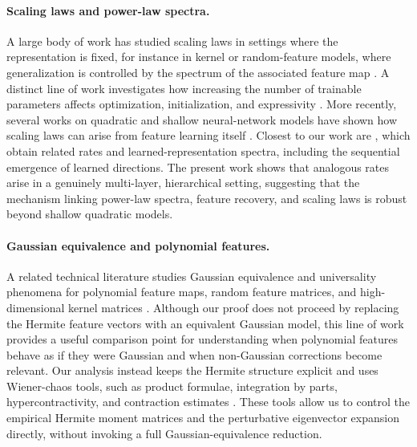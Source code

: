 \documentclass[]{article}
\numberwithin{equation}{section}
\theoremstyle{definition}
\begin{document}
\paragraph{Scaling laws and power-law spectra.}
A large body of work has studied scaling laws in settings where the representation is fixed, for instance in kernel or random-feature models, where generalization is controlled by the spectrum of the associated feature map \citep{caponnetto2007optimal,bordelon2020spectrum,spigler2020asymptotic,cui2021generalization,maloney2022solvable,cui2023error,bahri2024explaining,paquette2024four,defilippis2024dimension,atanasov2024scaling,bordelon2024dynamical,wortsman2025kernel}. A distinct line of work investigates how increasing the number of trainable parameters affects optimization, initialization, and expressivity \citep{yang2021tuning,bordelon2023depthwise,chizat2024feature,chaintron2026resnets}. More recently, several works on quadratic and shallow neural-network models have shown how scaling laws can arise from feature learning itself \citep{ren2025emergence,benarous2025learning,defilippis2025optimal,defilippis2025scaling,boncoraglio2025single}. Closest to our work are \citep{defilippis2025optimal,defilippis2025scaling}, which obtain related rates and learned-representation spectra, including the sequential emergence of learned directions. The present work shows that analogous rates arise in a genuinely multi-layer, hierarchical setting, suggesting that the mechanism linking power-law spectra, feature recovery, and scaling laws is robust beyond shallow quadratic models.

\paragraph{Gaussian equivalence and polynomial features.} A related technical literature studies Gaussian equivalence and universality phenomena for polynomial feature maps, random feature matrices, and high-dimensional kernel matrices \citep{hu2024asymptotics,COLTXU2025,wen2025does,lu2025equivalence}. Although our proof does not proceed by replacing the Hermite feature vectors with an equivalent Gaussian model, this line of work provides a useful comparison point for understanding when polynomial features behave as if they were Gaussian and when non-Gaussian corrections become relevant. Our analysis instead keeps the Hermite structure explicit and uses Wiener-chaos tools, such as product formulae, integration by parts, hypercontractivity, and contraction estimates \citep{nualart2005central,nourdin2009stein,nourdin2012normal}. These tools allow us to control the empirical Hermite moment matrices and the perturbative eigenvector expansion directly, without invoking a full Gaussian-equivalence reduction.
\end{document}
